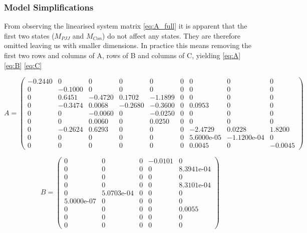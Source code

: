 \subsubsection{Model Simplifications}
From observing the linearised system matrix \cref{eq:A_full} it is apparent that the first two states ($M_{PJJ}$ and $M_{Con}$) do not affect any states. They are therefore omitted leaving us with smaller dimensions. In practice this means removing the first two rows and columns of A, rows of B and columns of C, yielding \cref{eq:A} \cref{eq:B} \cref{eq:C}

\begin{equation}  \label{eq:A}
	A = \left(\begin{array}{ccccccccc}
		-0.2440 & 0 & 0 & 0 & 0 & 0 & 0 & 0 & 0\\
		0 & -0.1000 & 0 & 0 & 0 & 0 & 0 & 0 & 0\\
		0 & 0.6451 & -0.4720 & 0.1702 & -1.1899 & 0 & 0 & 0 & 0\\
		0 & -0.3474 & 0.0068 & -0.2680 & -0.3600 & 0 & 0.0953 & 0 & 0\\
		0 & 0 & -0.0060 & 0 & -0.0250 & 0 & 0 & 0 & 0\\
		0 & 0 & 0.0060 & 0 & 0.0250 & 0 & 0 & 0 & 0\\
		0 & -0.2624 & 0.6293 & 0 & 0 & 0 & -2.4729 & 0.0228 & 1.8200\\
		0 & 0 & 0 & 0 & 0 & 0 & \text{5.6000e-05} & -\text{1.1200e-04} & 0\\
		0 & 0 & 0 & 0 & 0 & 0 & 0.0045 & 0 & -0.0045
	\end{array}\right)
\end{equation}

\bigskip

\begin{equation}  \label{eq:B}
	B = \left(\begin{array}{ccccc}
		0 & 0 & 0 & -0.0101 & 0\\
		0 & 0 & 0 & 0 & \text{8.3941e-04}\\
		0 & 0 & 0 & 0 & 0\\
		0 & 0 & 0 & 0 & \text{8.3101e-04}\\
		0 & \text{5.0703e-04} & 0 & 0 & 0\\
		\text{5.0000e-07} & 0 & 0 & 0 & 0\\
		0 & 0 & 0 & 0 & 0.0055\\
		0 & 0 & 0 & 0 & 0\\
		0 & 0 & 0 & 0 & 0
	\end{array}\right)
\end{equation}

